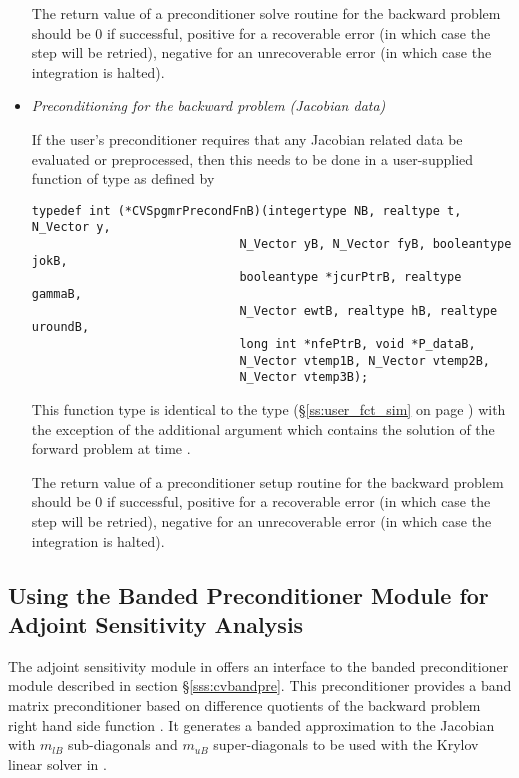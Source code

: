 \begin{itemize}
  The return value of a preconditioner solve routine for the backward
  problem should be $0$ if successful, 
  positive for a recoverable error (in which case the step will be retried),     
  negative for an unrecoverable error (in which case the integration is halted).

\item {\em Preconditioning for the backward problem
    (Jacobian data)}

  If the user's preconditioner requires that any Jacobian related data
  be evaluated or preprocessed, then this needs to be done in a
  user-supplied {\C} function of type  
  as defined by
\begin{verbatim}
typedef int (*CVSpgmrPrecondFnB)(integertype NB, realtype t, N_Vector y, 
                             N_Vector yB, N_Vector fyB, booleantype jokB, 
                             booleantype *jcurPtrB, realtype gammaB,
                             N_Vector ewtB, realtype hB, realtype uroundB,
                             long int *nfePtrB, void *P_dataB,
                             N_Vector vtemp1B, N_Vector vtemp2B,
                             N_Vector vtemp3B);
\end{verbatim}
  This function type is identical to the type 
  (\S\ref{ss:user_fct_sim} on page \pageref{p:precond}) with the exception
  of the additional argument  which contains the solution of the 
  forward problem at time .

  The return value of a preconditioner setup routine for the backward
  problem should be $0$ if successful, 
  positive for a recoverable error (in which case the step will be retried),     
  negative for an unrecoverable error (in which case the integration is halted).

\end{itemize}

\subsection{Using the Banded Preconditioner Module for Adjoint Sensitivity Analysis}

The adjoint sensitivity module in {\cvodes} offers an interface to the banded 
preconditioner module {\cvbandpre} described in section \S\ref{sss:cvbandpre}.
This preconditioner provides a band matrix preconditioner based on difference
quotients of the backward problem right hand side function . It generates
a banded approximation to the Jacobian with $m_{lB}$ sub-diagonals and $m_{uB}$
super-diagonals to be used with the Krylov linear solver in {\cvspgmr}.

